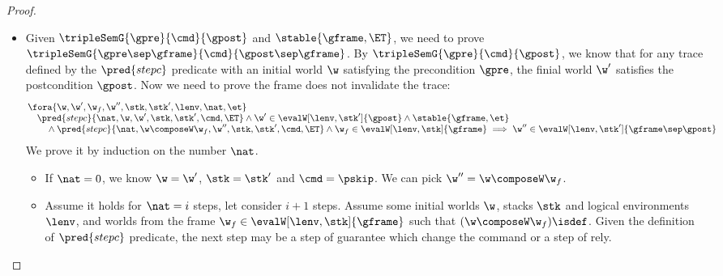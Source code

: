 \begin{proof}
\begin{itemize}
\item {}
Given \( \tripleSemG{\gpre}{\cmd}{\gpost} \) and \( \stable{\gframe, \ET}\), we need to prove \( \tripleSemG{\gpre \sep \gframe }{\cmd}{\gpost \sep \gframe } \).
By \( \tripleSemG{\gpre}{\cmd}{\gpost} \), we know that for any trace defined by the \( \pred{stepc} \) predicate with an initial world \( \w \) satisfying the precondition \( \gpre \), the finial world \( \w' \) satisfies the postcondition \( \gpost \). 
Now we need to prove the frame does not invalidate the trace:
\[
\begin{array}[t]{@{}l}
    \fora{ \w,\w', \w_{f}, \w'', \stk, \stk', \lenv, \nat, \et } \\
    \quad \pred{stepc}{\nat, \w, \w', \stk, \stk', \cmd, \ET} 
    \land \w' \in \evalW[\lenv, \stk']{\gpost}  
    \land \stable{\gframe, \et} \\
    \qquad {} \land \pred{stepc}{\nat, \w \composeW \w_f, \w'', \stk, \stk', \cmd, \ET} 
    \land \w_f \in \evalW[\lenv, \stk]{\gframe} 
    \implies \w'' \in \evalW[\lenv, \stk']{\gframe \sep \gpost}
\end{array}
\]
We prove it by induction on the number \( \nat \).
\begin{itemize}
\item If \( \nat = 0 \),  we know \( \w = \w'\), \( \stk = \stk'\) and \( \cmd = \pskip \).
We can pick \( \w'' = \w \composeW \w_f\).

\item Assume it holds for \( \nat = i \) steps, let consider \( i + 1 \) steps.
Assume some initial worlds \( \w \), stacks \( \stk \) and logical environments \( \lenv \), and worlds from the frame \( \w_f \in \evalW[\lenv, \stk]{\gframe}\) such that \( (\w \composeW \w_f)\isdef \).
Given the definition of \( \pred{stepc}\) predicate, the next step may be a step of guarantee which change the command or a step of rely.

\begin{itemize}


\end{itemize}
\end{itemize}
\end{itemize}
\end{proof}
